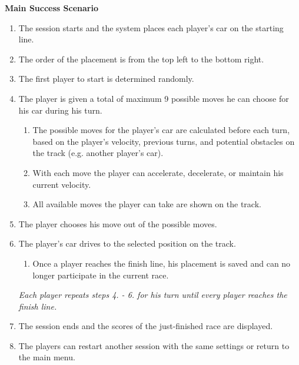 			\textbf{Main Success Scenario}
				\begin{enumerate}
					\item The session starts and the system places each player's car on the starting line.
					\item The order of the placement is from the top left to the bottom right.
					\item The first player to start is determined randomly.
					\item The player is given a total of maximum 9 possible moves he can choose for his car during his turn.
					\begin{enumerate}
						\item The possible moves for the player's car are calculated before each turn, based on the player's velocity, previous turns, and potential obstacles on the track (e.g. another player's car).
						\item With each move the player can accelerate, decelerate, or maintain his current velocity.
						\item All available moves the player can take are shown on the track.
					\end{enumerate}
					\item The player chooses his move out of the possible moves.
					\item The player's car drives to the selected position on the track.
					\begin{enumerate}
						\item Once a player reaches the finish line, his placement is saved and can no longer participate in the current race.
					\end{enumerate}
					\textit{Each player repeats steps 4. - 6. for his turn until every player reaches the finish line.}
					\item The session ends and the scores of the just-finished race are displayed.
					\item The players can restart another session with the same settings or return to the main menu.
				\end{enumerate}


